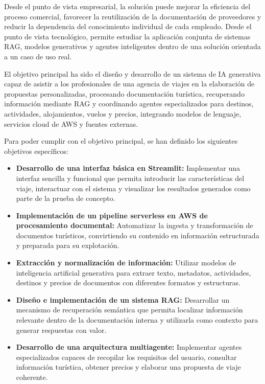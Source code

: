 Desde el punto de vista empresarial, la solución puede mejorar la eficiencia del proceso comercial, favorecer la reutilización de la documentación de proveedores y reducir la dependencia del conocimiento individual de cada empleado. Desde el punto de vista tecnológico, permite estudiar la aplicación conjunta de sistemas RAG, modelos generativos y agentes inteligentes dentro de una solución orientada a un caso de uso real.

El objetivo principal ha sido el diseño y desarrollo de un sistema de IA generativa capaz de asistir a los profesionales de una agencia de viajes en la elaboración de propuestas personalizadas, procesando documentación turística, recuperando información mediante RAG y coordinando agentes especializados para destinos, actividades, alojamientos, vuelos y precios, integrando modelos de lenguaje, servicios cloud de AWS y fuentes externas.

Para poder cumplir con el objetivo principal, se han definido los siguientes objetivos específicos:
\begin{itemize}
\item \textbf{Desarrollo de una interfaz básica en Streamlit:} Implementar una interfaz sencilla y funcional que permita introducir las características del viaje, interactuar con el sistema y visualizar los resultados generados como parte de la prueba de concepto.
\item \textbf{Implementación de un pipeline serverless en AWS de procesamiento documental:} Automatizar la ingesta y transformación de documentos turísticos, convirtiendo su contenido en información estructurada y preparada para su explotación.
\item \textbf{Extracción y normalización de información:} Utilizar modelos de inteligencia artificial generativa para extraer texto, metadatos, actividades, destinos y precios de documentos con diferentes formatos y estructuras.
\item \textbf{Diseño e implementación de un sistema RAG:} Desarrollar un mecanismo de recuperación semántica que permita localizar información relevante dentro de la documentación interna y utilizarla como contexto para generar respuestas con valor.
\item \textbf{Desarrollo de una arquitectura multiagente:} Implementar agentes especializados capaces de recopilar los requisitos del usuario, consultar información turística, obtener precios y elaborar una propuesta de viaje coherente.
\end{itemize}


